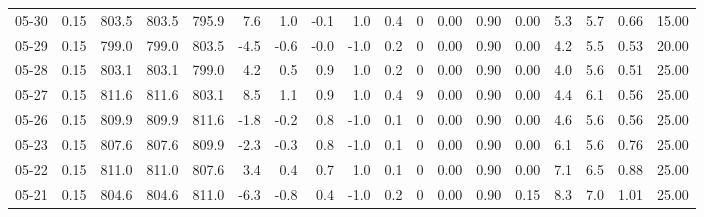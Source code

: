 \begin{threeparttable}
{\begin{tabular}{lrrrrrrrrrrrrrrrrr}
  05-30 &     0.15 & 803.5 & 803.5 & 795.9 &        7.6 &            1.0 &                      -0.1 &                      1.0 &                 0.4 &              0 &       0.00 &      0.90 &           0.00 &              5.3 &                 5.7 &            0.66 &                  15.00 \\
  05-29 &     0.15 & 799.0 & 799.0 & 803.5 &       -4.5 &           -0.6 &                      -0.0 &                     -1.0 &                 0.2 &              0 &       0.00 &      0.90 &           0.00 &              4.2 &                 5.5 &            0.53 &                  20.00 \\
  05-28 &     0.15 & 803.1 & 803.1 & 799.0 &        4.2 &            0.5 &                       0.9 &                      1.0 &                 0.2 &              0 &       0.00 &      0.90 &           0.00 &              4.0 &                 5.6 &            0.51 &                  25.00 \\
  05-27 &     0.15 & 811.6 & 811.6 & 803.1 &        8.5 &            1.1 &                       0.9 &                      1.0 &                 0.4 &              9 &       0.00 &      0.90 &           0.00 &              4.4 &                 6.1 &            0.56 &                  25.00 \\
  05-26 &     0.15 & 809.9 & 809.9 & 811.6 &       -1.8 &           -0.2 &                       0.8 &                     -1.0 &                 0.1 &              0 &       0.00 &      0.90 &           0.00 &              4.6 &                 5.6 &            0.56 &                  25.00 \\
  05-23 &     0.15 & 807.6 & 807.6 & 809.9 &       -2.3 &           -0.3 &                       0.8 &                     -1.0 &                 0.1 &              0 &       0.00 &      0.90 &           0.00 &              6.1 &                 5.6 &            0.76 &                  25.00 \\
  05-22 &     0.15 & 811.0 & 811.0 & 807.6 &        3.4 &            0.4 &                       0.7 &                      1.0 &                 0.1 &              0 &       0.00 &      0.90 &           0.00 &              7.1 &                 6.5 &            0.88 &                  25.00 \\
  05-21 &     0.15 & 804.6 & 804.6 & 811.0 &       -6.3 &           -0.8 &                       0.4 &                     -1.0 &                 0.2 &              0 &       0.00 &      0.90 &           0.15 &              8.3 &                 7.0 &            1.01 &                  25.00 \\

\end{tabular}}
\end{threeparttable}
